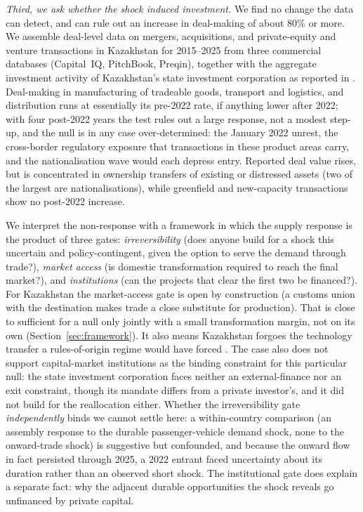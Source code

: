 \documentclass[12pt]{article}
\begin{document}
\emph{Third, we ask whether the shock induced investment.} We find no change the data can detect, and can rule out an increase in deal-making of about 80\% or more. We assemble deal-level data on mergers, acquisitions, and private-equity and venture
transactions in Kazakhstan for 2015--2025 from three commercial databases (Capital~IQ,
PitchBook, Preqin), together with the aggregate investment activity of Kazakhstan's state
investment corporation as reported in \citet{qicaifcifc2026pe}. Deal-making in manufacturing of tradeable goods,
transport and logistics, and distribution runs at essentially its pre-2022 rate, if anything
lower after 2022; with four post-2022 years the test rules out a large response, not a modest
step-up, and the null is in any case over-determined: the January 2022 unrest, the cross-border regulatory exposure that transactions in these product areas carry, and the nationalisation wave would each depress entry. Reported deal value
rises, but is concentrated in ownership transfers of existing or
distressed assets (two of the largest are nationalisations), while greenfield and
new-capacity transactions show no post-2022 increase.

We interpret the non-response with a framework in which the supply response is the product of
three gates: \emph{irreversibility} (does anyone build for a shock this uncertain and
policy-contingent, given the option to serve the demand through trade?), \emph{market access}
(is domestic transformation required to reach the final market?), and \emph{institutions} (can
the projects that clear the first two be financed?). For Kazakhstan the market-access gate is open by construction (a customs union with the destination makes trade a close substitute for
production). That is close to sufficient for a null only jointly with a small transformation
margin, not on its own (Section~\ref{sec:framework}). It also means Kazakhstan forgoes
the technology transfer a rules-of-origin regime would have forced \citep{desouza2024diffusion}. The case also does not support capital-market institutions as the binding constraint for this particular null: the state investment corporation faces neither an external-finance nor an exit constraint, though its mandate differs from a private investor's, and it did not build for the reallocation either. Whether the irreversibility gate
\emph{independently} binds we cannot settle here: a within-country comparison (an assembly
response to the durable passenger-vehicle demand shock, none to the onward-trade shock) is
suggestive but confounded, and because the onward flow in fact persisted through 2025, a
2022 entrant faced uncertainty about its duration rather than an observed short shock. The
institutional gate does explain a separate fact: why the adjacent durable opportunities the
shock reveals go unfinanced by private capital.
\end{document}
